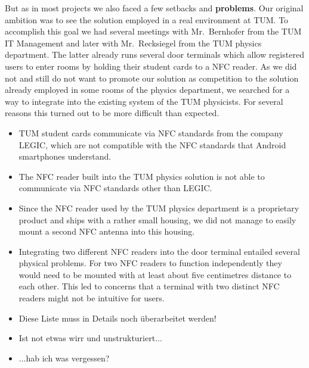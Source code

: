 But as in most projects we also faced a few setbacks and \textbf{problems}.
Our original ambition was to see the \app solution employed in a real environment at TUM.
To accomplish this goal we had several meetings with Mr.~Bernhofer from the TUM IT Management and later with Mr.~Recksiegel from the TUM physics department.
The latter already runs several door terminals which allow registered users to enter rooms by holding their student cards to a NFC reader.
As we did not and still do not want to promote our solution as competition to the solution already employed in some rooms of the physics department, we searched for a way to integrate \app into the existing system of the TUM physicists.
For several reasons this turned out to be more difficult than expected.
\begin{itemize}
\item TUM student cards communicate via NFC standards from the company LEGIC, which are not compatible with the NFC standards that Android smartphones understand.
\item The NFC reader built into the TUM physics solution is not able to communicate via NFC standards other than LEGIC.
\item Since the NFC reader used by the TUM physics department is a proprietary product and ships with a rather small housing, we did not manage to easily mount a second NFC antenna into this housing.
\item Integrating two different NFC readers into the door terminal entailed several physical problems.
For two NFC readers to function independently they would need to be mounted with at least about five centimetres distance to each other.
This led to concerns that a terminal with two distinct NFC readers might not be intuitive for users.
\item Diese Liste muss in Details noch überarbeitet werden!\todo{!!!}
\item Ist not etwas wirr und unstrukturiert...
\item ...hab ich was vergessen?
\end{itemize}


\iffalse

:\todo{TODO}
hatten wir ja ein paar: Zusammenspiel mit anderen Lesegeräten (Legic), ...
-> dadurch: unwahrscheinlicher, dass die Lösung in der Praxis eingesetzt werden wird.

any problems? Differences to the planned functionality?

Differences to the planned functionality:
gibt's bei uns eher nicht, oder?

Stefan: Ne, eigentlich sogar noch mehr Funktionalität und erhöhte Sicherheit/Anonymität als spezifiziert.
\fi